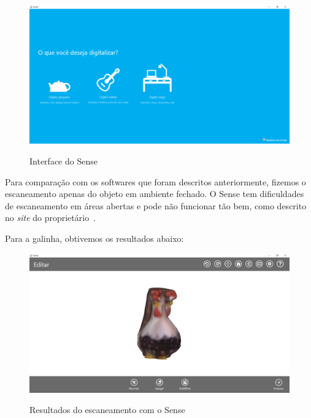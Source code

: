 \begin{figure}[!h]
	\centering
	\caption{Interface do Sense}		
	\includegraphics[width=0.8\linewidth]{figs/sense5v2.png}
	\label{fig:sense1}
\end{figure} 

Para comparação com os softwares que foram descritos anteriormente, fizemos o escaneamento apenas do objeto em ambiente fechado. O Sense tem dificuldades de escaneamento em áreas abertas e pode não funcionar tão bem, como descrito no \emph{site} do proprietário~\cite{3DSystems}. 

Para a galinha, obtivemos os resultados abaixo:

\begin{figure}[!h]
	\centering
	\caption{Resultados do escaneamento com o Sense}
	\includegraphics[width=0.9\linewidth]{figs/sense7v2.png}
		\label{fig:sense3}
\end{figure} 

